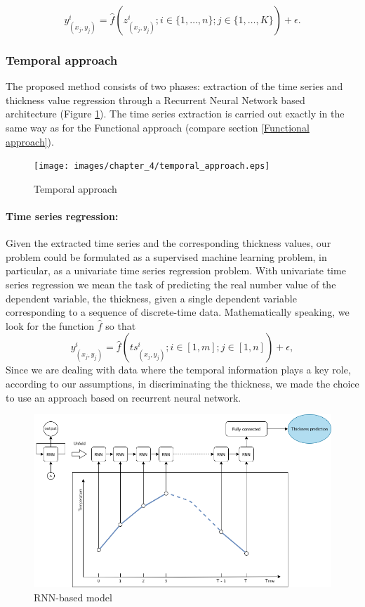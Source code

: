 \begin{equation}
    y^{i}_{(x_j,y_j)} = \hat{f}(z^{i}_{(x_j, y_j)}; i \in \{1, \ldots,n\}; j \in \{1, \ldots,K\}) + \epsilon.
\end{equation} 

\subsubsection{Temporal approach}

The proposed method consists of two phases: extraction of the time series and thickness value regression through a Recurrent Neural Network based architecture (Figure \ref{fig:temporal_approach}). The time series extraction is carried out exactly in the same way as for the Functional approach (compare section \ref{Functional approach}).  

\begin{figure}
\centering
\texttt{[image: images/chapter\_4/temporal\_approach.eps]}
\caption{Temporal approach}
\label{fig:temporal_approach}
\end{figure}

\paragraph{Time series regression:}

Given the extracted time series and the corresponding thickness values, our problem could be formulated as a supervised machine learning problem, in particular, as a univariate time series regression problem. With univariate time series regression we mean the task of predicting the real number value of the dependent variable, the thickness, given a single dependent variable corresponding to a sequence of discrete-time data. 
Mathematically speaking, we look for the function $\hat{f}$ so that
\begin{equation}
    y^{i}_{(x_j,y_j)} = \hat{f}(ts^{i}_{(x_j, y_j)}; i \in [1, m]; j \in [1, n]) + \epsilon,
\end{equation} 
Since we are dealing with data where the temporal information plays a key role, according to our assumptions, in discriminating the thickness, we made the choice to use an approach based on recurrent neural network. 

\begin{figure}
\centering
\includegraphics[scale=0.45]{images/chapter_4/rnn_model.png}
\caption{RNN-based model}
\label{fig:rnn_model}
\end{figure}


